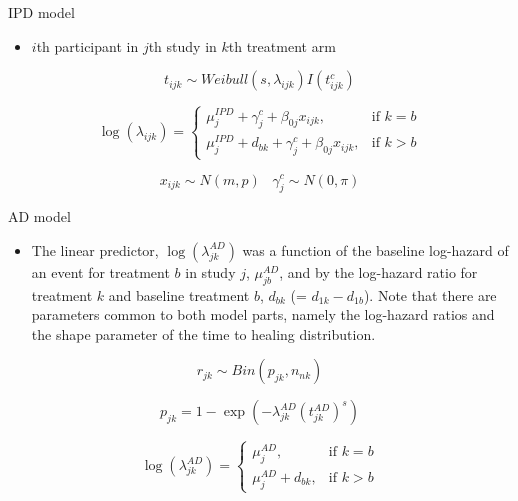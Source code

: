 \documentclass[
  ignorenonframetext,
]{beamer}
\providecommand{\tightlist}{%
  \setlength{\itemsep}{0pt}\setlength{\parskip}{0pt}}\usepackage{longtable,booktabs,array}
\begin{document}
\begin{frame}{IPD model}
\protect\hypertarget{ipd-model}{}
\begin{itemize}
\tightlist
\item
  \(i\)th participant in \(j\)th study in \(k\)th treatment arm
\end{itemize}

\[
t_{ijk} \sim Weibull(s, \lambda_{ijk}) I(t^c_{ijk})
\]

\[
\log(\lambda_{ijk}) = 
\begin{cases}
    \mu_j^{IPD} + \gamma_j^c + \beta_{0j}x_{ijk}, & \text{if } k=b\\
    \mu_j^{IPD} + d_{bk} + \gamma_j^c + \beta_{0j}x_{ijk}, & \text{if } k \gt b
\end{cases}
\]

\[
x_{ijk} \sim N(m,p) \;\;\; \gamma^c_j \sim N(0, \pi)
\]
\end{frame}

\begin{frame}{AD model}
\protect\hypertarget{ad-model}{}
\begin{itemize}
\tightlist
\item
  The linear predictor, \(\log(\lambda^{AD}_{jk})\) was a function of
  the baseline log-hazard of an event for treatment \(b\) in study
  \(j\), \(\mu^{AD}_{jb}\), and by the log-hazard ratio for treatment
  \(k\) and baseline treatment \(b\), \(d_{bk}\) (=
  \(d_{1k} − d_{1b}\)). Note that there are parameters common to both
  model parts, namely the log-hazard ratios and the shape parameter of
  the time to healing distribution.
\end{itemize}

\[
r_{jk} \sim Bin(p_{jk}, n_{nk})
\]

\[
p_{jk} = 1 - \exp(- \lambda_{jk}^{AD} {(t^{AD}_{jk})}^s)
\]

\[
\log(\lambda_{jk}^{AD}) =
\begin{cases}
    \mu_j^{AD}, & \text{if } k=b\\
    \mu_j^{AD} + d_{bk}, & \text{if } k \gt b
\end{cases}
\]
\end{frame}
\end{document}
